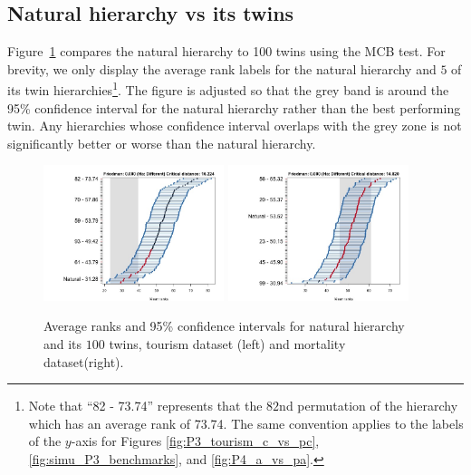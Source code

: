 \documentclass[a4paper,review,12pt,authoryear]{elsarticle}
\begin{document}
\subsection{Natural hierarchy vs its twins}

\label{subsec:n_vs_pn}


Figure~\ref{fig:P2_tourism} compares the natural hierarchy to 100 twins using the MCB test. For brevity, we only display the average rank labels for the natural hierarchy and $5$ of its twin hierarchies\footnote{Note that ``82 - 73.74'' represents that the $82$nd permutation of the hierarchy which has an average rank of 73.74. The same convention applies to the labels of the $y$-axis for Figures \ref{fig:P3_tourism_c_vs_pc},  \ref{fig:simu_P3_benchmarks}, and \ref{fig:P4_a_vs_pa}.}. The figure is adjusted so that the grey band is around the 95\% confidence interval for the natural hierarchy rather than the best performing twin. Any hierarchies whose confidence interval overlaps with the grey zone is not significantly better or worse than the natural hierarchy. 

\begin{figure}[h!]
    \centering
    \includegraphics[width=0.47\textwidth]{../figures/Figure6_tourism_natural_vs_pn.jpg}
    \centering    \includegraphics[width=0.47\textwidth]{../figures/Figure6_mortality_natural_vs_pn.jpg}
    \caption{\label{fig:P2_tourism}Average ranks and 95\% confidence intervals for natural hierarchy and its $100$ twins, tourism dataset (left) and mortality dataset(right).}
\end{figure}
 
\end{document}
